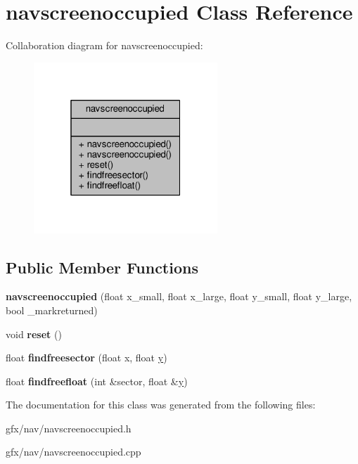 \hypertarget{classnavscreenoccupied}{}\section{navscreenoccupied Class Reference}
\label{classnavscreenoccupied}


Collaboration diagram for navscreenoccupied\+:
\nopagebreak
\begin{figure}[H]
\begin{center}
\leavevmode
\includegraphics[width=196pt]{d0/dd6/classnavscreenoccupied__coll__graph}
\end{center}
\end{figure}
\subsection*{Public Member Functions}
\begin{DoxyCompactItemize}
\item 
{\bfseries navscreenoccupied} (float x\+\_\+small, float x\+\_\+large, float y\+\_\+small, float y\+\_\+large, bool \+\_\+markreturned)\hypertarget{classnavscreenoccupied_a5cad6becf9f714a36fa5895dce45467b}{}\label{classnavscreenoccupied_a5cad6becf9f714a36fa5895dce45467b}

\item 
void {\bfseries reset} ()\hypertarget{classnavscreenoccupied_ab23f75babca8b66c65ee4c1fcaf633ce}{}\label{classnavscreenoccupied_ab23f75babca8b66c65ee4c1fcaf633ce}

\item 
float {\bfseries findfreesector} (float x, float \hyperlink{IceUtils_8h_aa7ffaed69623192258fb8679569ff9ba}{y})\hypertarget{classnavscreenoccupied_a3512dd202e11b47b7c9690f78ea59021}{}\label{classnavscreenoccupied_a3512dd202e11b47b7c9690f78ea59021}

\item 
float {\bfseries findfreefloat} (int \&sector, float \&\hyperlink{IceUtils_8h_aa7ffaed69623192258fb8679569ff9ba}{y})\hypertarget{classnavscreenoccupied_a429a7401cd516d128fba80fde5af01c1}{}\label{classnavscreenoccupied_a429a7401cd516d128fba80fde5af01c1}

\end{DoxyCompactItemize}


The documentation for this class was generated from the following files\+:\begin{DoxyCompactItemize}
\item 
gfx/nav/navscreenoccupied.\+h\item 
gfx/nav/navscreenoccupied.\+cpp\end{DoxyCompactItemize}
